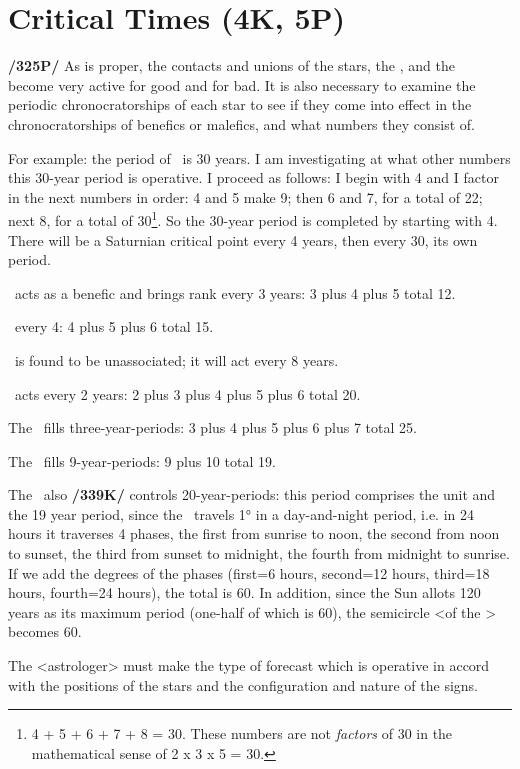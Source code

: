 \section{Critical Times (4K, 5P)}

\textbf{/325P/} As is proper, the contacts and unions of the stars, the \Sun, and the \Moon\, become very active for good and for bad. It is also necessary to examine the periodic chronocratorships of each star to see if they come into effect in the chronocratorships of benefics or malefics, and what numbers they consist of. 

For example: the period of \Saturn\, is 30 years. I am investigating at what other numbers this 30-year period is operative. I proceed as follows: I begin with 4 and I factor in the next numbers in order: 4 and 5 make 9; then 6 and 7, for a total of 22; next 8, for a total of 30\footnote{4 + 5 + 6 + 7 + 8 = 30. These numbers are not \textsl{factors} of 30 in the mathematical sense of 2 x 3 x 5 = 30.}. So the 30-year period is completed by starting with 4. There will be a Saturnian critical point every 4 years, then every 30, its own period.

\Jupiter\, acts as a benefic and brings rank every 3 years: 3 plus 4 plus 5 total 12.

\Mars\, every 4: 4 plus 5 plus 6 total 15.

\Venus\, is found to be unassociated; it will act every 8 years.

\Mercury\, acts every 2 years: 2 plus 3 plus 4 plus 5 plus 6 total 20.

The \Moon\, fills three-year-periods: 3 plus 4 plus 5 plus 6 plus 7 total 25.

The \Sun\, fills 9-year-periods: 9 plus 10 total 19. 

The \Sun\, also \textbf{/339K/} controls 20-year-periods: this period comprises the unit and the 19 year period, since the \Sun\, travels 1° in a day-and-night period, i.e. in 24 hours it traverses 4 phases, the first from sunrise to noon, the second from noon to sunset, the third from sunset to midnight, the fourth from midnight to sunrise. If we add the degrees of the phases (first=6 hours, second=12 hours, third=18 hours, fourth=24 hours), the total is 60. In addition, since the Sun allots 120 years as its maximum period (one-half of which is 60), the semicircle <of the \Sun> becomes 60. 

The <astrologer> must make the type of forecast which is operative in accord with the positions of the stars and the configuration and nature of the signs.

\newpage